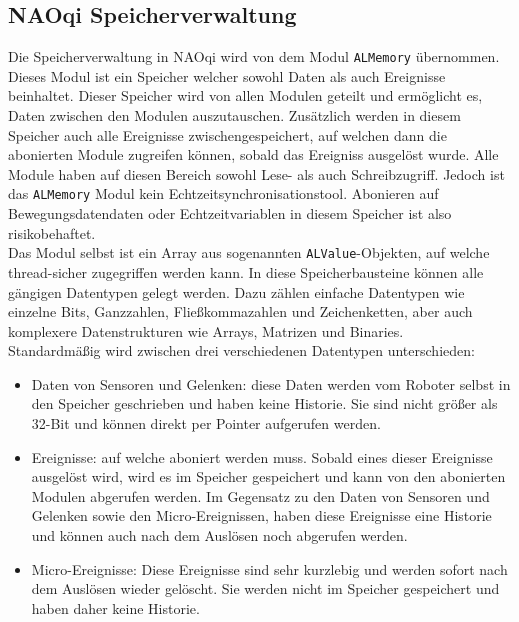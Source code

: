 \subsection{NAOqi Speicherverwaltung}\label{subsec:NAOqiSpeicherverwaltung}
Die Speicherverwaltung in NAOqi wird von dem Modul \texttt{ALMemory} übernommen. Dieses Modul ist ein Speicher welcher sowohl Daten als auch Ereignisse beinhaltet. Dieser Speicher wird von allen Modulen geteilt und ermöglicht es, Daten zwischen den Modulen auszutauschen. Zusätzlich werden in diesem Speicher auch alle Ereignisse zwischengespeichert, auf welchen dann die abonierten Module zugreifen können, sobald das Ereigniss ausgelöst wurde. Alle Module haben auf diesen Bereich sowohl Lese- als auch Schreibzugriff. Jedoch ist das \texttt{ALMemory} Modul kein Echtzeitsynchronisationstool. Abonieren auf Bewegungsdatendaten oder Echtzeitvariablen in diesem Speicher ist also risikobehaftet.\\
Das Modul selbst ist ein Array aus sogenannten \texttt{ALValue}-Objekten, auf welche thread-sicher zugegriffen werden kann. In diese Speicherbausteine können alle gängigen Datentypen gelegt werden. Dazu zählen einfache Datentypen wie einzelne Bits, Ganzzahlen, Fließkommazahlen und Zeichenketten, aber auch komplexere Datenstrukturen wie Arrays, Matrizen und Binaries.\\
Standardmäßig wird zwischen drei verschiedenen Datentypen unterschieden:\\
\begin{itemize}
    \item Daten von Sensoren und Gelenken: diese Daten werden vom Roboter selbst in den Speicher geschrieben und haben keine Historie. Sie sind nicht größer als 32-Bit und können direkt per Pointer aufgerufen werden.
    \item Ereignisse: auf welche aboniert werden muss. Sobald eines dieser Ereignisse ausgelöst wird, wird es im Speicher gespeichert und kann von den abonierten Modulen abgerufen werden. Im Gegensatz zu den Daten von Sensoren und Gelenken sowie den Micro-Ereignissen, haben diese Ereignisse eine Historie und können auch nach dem Auslösen noch abgerufen werden.
    \item Micro-Ereignisse: Diese Ereignisse sind sehr kurzlebig und werden sofort nach dem Auslösen wieder gelöscht. Sie werden nicht im Speicher gespeichert und haben daher keine Historie.
\end{itemize}


